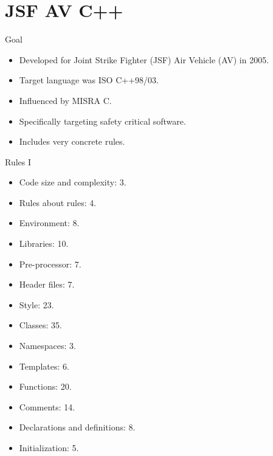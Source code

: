 \section{JSF AV C++}

\begin{frame}[t]{Goal}
\begin{itemize}
  \item Developed for Joint Strike Fighter (JSF) Air Vehicle (AV) in 2005.

  \vfill
  \item Target language was ISO C++98/03.

  \vfill
  \item Influenced by MISRA C.

  \vfill
  \item Specifically targeting safety critical software.

  \vfill
  \item Includes very concrete rules.
\end{itemize}
\end{frame}

\begin{frame}[t,shrink]{Rules I}
\begin{itemize}
  \item Code size and complexity: 3.
  \item Rules about rules: 4.
  \item Environment: 8.
  \item Libraries: 10.
  \item Pre-processor: 7.
  \item Header files: 7.
  \item Style: 23.
  \item Classes: 35.
  \item Namespaces: 3.
  \item Templates: 6.
  \item Functions: 20.
  \item Comments: 14.
  \item Declarations and definitions: 8.
  \item Initialization: 5.
\end{itemize}
\end{frame}

